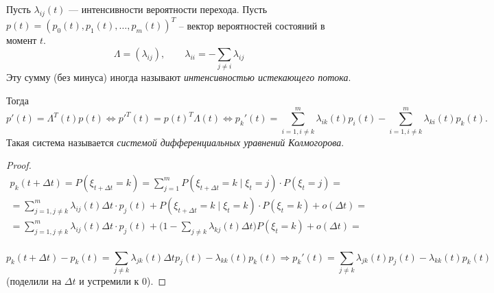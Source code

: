 \begin{theorem}
  Пусть $\lambda_{ij}(t)$ --- интенсивности вероятности перехода. Пусть
  $p(t) = (p_0(t), p_1(t), \dots, p_m(t))^T$
  -- вектор вероятностей состояний в момент $t$.
  \[
    \Lambda = (\lambda_{ij}),\qquad \lambda_{ii} = - \sum_{j\neq i} \lambda_{ij} 
  \]
  Эту сумму (без минуса) иногда называют \emph{интенсивностью истекающего
  потока}.

  Тогда
  \[
    p'(t) = \Lambda^T(t) p(t) 
    \Leftrightarrow
    p'^T(t) = p(t)^T \Lambda(t)
    \Leftrightarrow
    p_k'(t)
    = \sum_{i=1, i\neq k}^m \lambda_{ik}(t) p_{i}(t)
      - \sum_{i=1, i\neq k}^m \lambda_{ki}(t) p_k(t).
  \]
  Такая система называется \emph{системой дифференциальных уравнений
  Колмогорова}.
\end{theorem}
\begin{proof}
  \begin{multline*}
    p_k(t+\Delta t) = P(\xi_{t+\Delta t} = k)
    = \sum_{j=1}^m P(\xi_{t+\Delta t} = k \mid \xi_t = j) \cdot P(\xi_t = j) = \\
    = \sum_{j=1, j \neq k}^m \lambda_{ij}(t) \Delta t \cdot p_j(t)
      + P(\xi_{t+\Delta t} = k \mid \xi_t = k) \cdot P(\xi_t = k) + o(\Delta t) = \\
    = \sum_{j=1, j \neq k}^m \lambda_{ij}(t) \Delta t \cdot p_j(t)
  + \biggl( 1 - \sum_{j\neq k} \lambda_{kj}(t) \Delta t\biggr)  P(\xi_t = k) + o(\Delta t) = \\
  \end{multline*}

  \[
    p_k(t+\Delta t) - p_k(t) = \sum_{j\neq k} \lambda_{jk}(t) \Delta t p_j(t) - \lambda_{kk} (t) p_k(t)
    \Rightarrow
    p_k'(t) = \sum_{j\neq k} \lambda_{jk} (t) p_j(t) - \lambda_{kk}(t) p_k(t)
  \]
  (поделили на $\Delta t$ и устремили к 0).
\end{proof}


